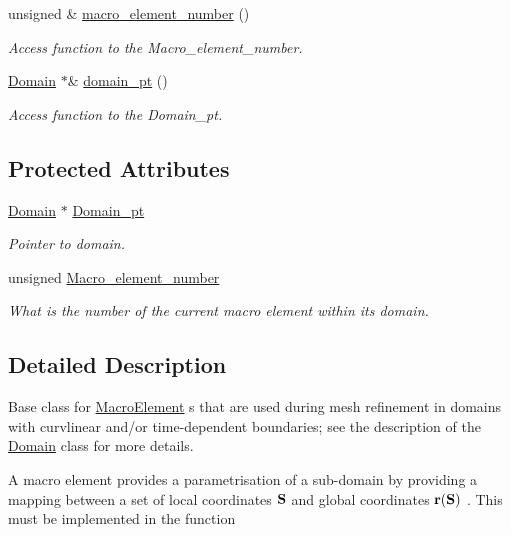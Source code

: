 \begin{DoxyCompactItemize}
unsigned \& \hyperlink{classoomph_1_1MacroElement_acc146caf3839d234c62cf9a4de2fbe91}{macro\+\_\+element\+\_\+number} ()
\begin{DoxyCompactList}\small\item\em Access function to the Macro\+\_\+element\+\_\+number. \end{DoxyCompactList}\item 
\hyperlink{classoomph_1_1Domain}{Domain} $\ast$\& \hyperlink{classoomph_1_1MacroElement_ab086ff8cbdb656eff8ab5eafd67bca07}{domain\+\_\+pt} ()
\begin{DoxyCompactList}\small\item\em Access function to the Domain\+\_\+pt. \end{DoxyCompactList}\end{DoxyCompactItemize}
\subsection*{Protected Attributes}
\begin{DoxyCompactItemize}
\item 
\hyperlink{classoomph_1_1Domain}{Domain} $\ast$ \hyperlink{classoomph_1_1MacroElement_a0eba5a165f20079899fb935508ab77e2}{Domain\+\_\+pt}
\begin{DoxyCompactList}\small\item\em Pointer to domain. \end{DoxyCompactList}\item 
unsigned \hyperlink{classoomph_1_1MacroElement_a96e31a1ba7eac203a3bacb3403796ec1}{Macro\+\_\+element\+\_\+number}
\begin{DoxyCompactList}\small\item\em What is the number of the current macro element within its domain. \end{DoxyCompactList}\end{DoxyCompactItemize}


\subsection{Detailed Description}
Base class for \hyperlink{classoomph_1_1MacroElement}{Macro\+Element} s that are used during mesh refinement in domains with curvlinear and/or time-\/dependent boundaries; see the description of the \hyperlink{classoomph_1_1Domain}{Domain} class for more details.

A macro element provides a parametrisation of a sub-\/domain by providing a mapping between a set of local coordinates $ {\bf S} $ and global coordinates $ {\bf r} ({\bf S}) $ . This must be implemented in the function


